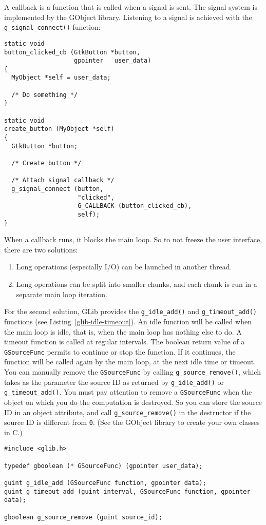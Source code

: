 A callback is a function that is called when a signal is sent. The signal system is implemented by the GObject library. Listening to a signal is achieved with the \lstinline{g_signal_connect()} function:
\begin{lstlisting}
static void
button_clicked_cb (GtkButton *button,
                   gpointer   user_data)
{
  MyObject *self = user_data;

  /* Do something */
}

static void
create_button (MyObject *self)
{
  GtkButton *button;

  /* Create button */

  /* Attach signal callback */
  g_signal_connect (button,
                    "clicked",
                    G_CALLBACK (button_clicked_cb),
                    self);
}
\end{lstlisting}

When a callback runs, it blocks the main loop. So to not freeze the user interface, there are two solutions:
\begin{enumerate}
  \item Long operations (especially I/O) can be launched in another thread.
  \item Long operations can be split into smaller chunks, and each chunk is run in a separate main loop iteration.
\end{enumerate}

For the second solution, GLib provides the \lstinline{g_idle_add()} and \lstinline{g_timeout_add()} functions (see Listing~\ref{glib-idle-timeout}). An idle function will be called when the main loop is idle, that is, when the main loop has nothing else to do. A timeout function is called at regular intervals. The boolean return value of a \lstinline{GSourceFunc} permits to continue or stop the function. If it continues, the function will be called again by the main loop, at the next idle time or timeout. You can manually remove the \lstinline{GSourceFunc} by calling \lstinline{g_source_remove()}, which takes as the parameter the source ID as returned by \lstinline{g_idle_add()} or \lstinline{g_timeout_add()}. You must pay attention to remove a \lstinline{GSourceFunc} when the object on which you do the computation is destroyed. So you can store the source ID in an object attribute, and call \lstinline{g_source_remove()} in the destructor if the source ID is different from \lstinline{0}. (See the GObject library to create your own classes in C.)

\begin{lstlisting}[float, caption={Idles and timeouts}, label=glib-idle-timeout]
#include <glib.h>

typedef gboolean (* GSourceFunc) (gpointer user_data);

guint g_idle_add (GSourceFunc function, gpointer data);
guint g_timeout_add (guint interval, GSourceFunc function, gpointer data);

gboolean g_source_remove (guint source_id);
\end{lstlisting}

